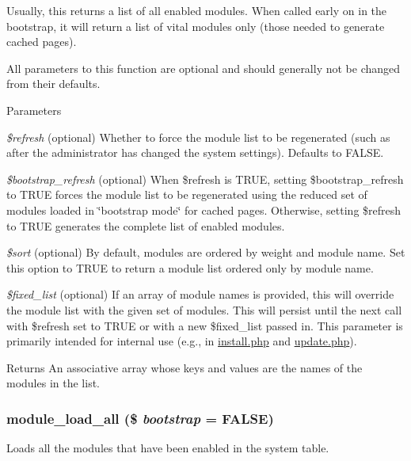 Usually, this returns a list of all enabled modules. When called early on in the bootstrap, it will return a list of vital modules only (those needed to generate cached pages).

All parameters to this function are optional and should generally not be changed from their defaults.


\begin{DoxyParams}{Parameters}
\item[{\em \$refresh}](optional) Whether to force the module list to be regenerated (such as after the administrator has changed the system settings). Defaults to FALSE. \item[{\em \$bootstrap\_\-refresh}](optional) When \$refresh is TRUE, setting \$bootstrap\_\-refresh to TRUE forces the module list to be regenerated using the reduced set of modules loaded in \char`\"{}bootstrap mode\char`\"{} for cached pages. Otherwise, setting \$refresh to TRUE generates the complete list of enabled modules. \item[{\em \$sort}](optional) By default, modules are ordered by weight and module name. Set this option to TRUE to return a module list ordered only by module name. \item[{\em \$fixed\_\-list}](optional) If an array of module names is provided, this will override the module list with the given set of modules. This will persist until the next call with \$refresh set to TRUE or with a new \$fixed\_\-list passed in. This parameter is primarily intended for internal use (e.g., in \hyperlink{install_8php}{install.php} and \hyperlink{update_8php}{update.php}).\end{DoxyParams}
\begin{DoxyReturn}{Returns}
An associative array whose keys and values are the names of the modules in the list. 
\end{DoxyReturn}
\hypertarget{module_8inc_a76db4bd7c4962f254d6cc9bed5f0e1f6}{
\subsubsection[{module\_\-load\_\-all}]{\setlength{\rightskip}{0pt plus 5cm}module\_\-load\_\-all (\$ {\em bootstrap} = {\ttfamily FALSE})}}
\label{module_8inc_a76db4bd7c4962f254d6cc9bed5f0e1f6}
Loads all the modules that have been enabled in the system table.


